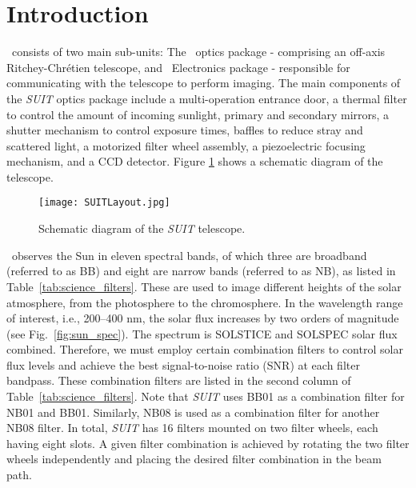 \justifying

\section{Introduction}\label{secc3_intro}

\suit~consists of two main sub-units: The \suit~optics package - comprising an off-axis Ritchey-Chr\'{e}tien telescope, and \suit~Electronics package - responsible for communicating with the telescope to perform imaging. The main components of the \textit{SUIT} optics package include a multi-operation entrance door, a thermal filter to control the amount of incoming sunlight, primary and secondary mirrors, a shutter mechanism to control exposure times, baffles to reduce stray and scattered light, a motorized filter wheel assembly, a piezoelectric focusing mechanism, and a CCD detector. Figure \ref{fig:suit} shows a schematic diagram of the telescope.

\begin{figure}[ht!]
    \centering
    \texttt{[image: SUITLayout.jpg]}
    \caption{Schematic diagram of the \textit{SUIT} telescope.}
    \label{fig:suit}
\end{figure}

\suit~observes the Sun in eleven spectral bands, of which three are broadband (referred to as BB) and eight are narrow bands (referred to as NB), as listed in Table~\ref{tab:science_filters}. These are used to image different heights of the solar atmosphere, from the photosphere to the chromosphere. In the wavelength range of interest, i.e., 200--400 nm, the solar flux increases by two orders of magnitude (see Fig.~\ref{fig:sun_spec}). The spectrum is SOLSTICE and SOLSPEC solar flux combined. Therefore, we must employ certain combination filters to control solar flux levels and achieve the best signal-to-noise ratio (SNR) at each filter bandpass. These combination filters are listed in the second column of Table~\ref{tab:science_filters}. Note that \textit{SUIT} uses BB01 as a combination filter for NB01 and BB01. Similarly, NB08 is used as a combination filter for another NB08 filter. In total, \textit{SUIT} has 16 filters mounted on two filter wheels, each having eight slots. A given filter combination is achieved by rotating the two filter wheels independently and placing the desired filter combination in the beam path.


